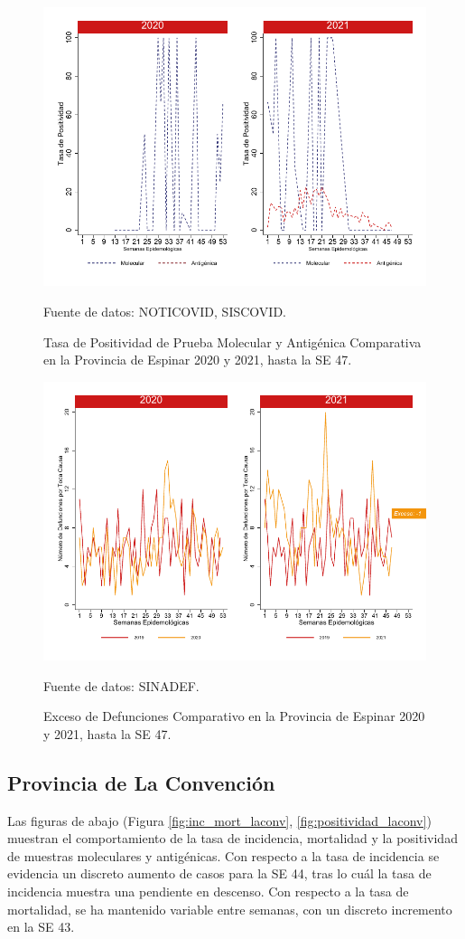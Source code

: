 \documentclass[12pt,a4paper,openany]{book}
\begin{document}
		\begin{figure}[h]
			\caption{Tasa de Positividad de Prueba Molecular y Antigénica Comparativa en la Provincia de Espinar 2020 y 2021, hasta la SE 47.}\label{fig:positividad_espinar}
			\begin{center}
				\includegraphics[width=0.7\linewidth]{../figuras/positividad_20_21_8}
			\end{center}
			{\footnotesize {Fuente de datos: NOTICOVID, SISCOVID.}}
		\end{figure}
		
		\begin{figure}[h]
			\caption{Exceso de Defunciones Comparativo en la Provincia de Espinar 2020 y 2021, hasta la SE 47.}\label{fig:exceso_espinar}
			\begin{center}
				\includegraphics[width=0.7\linewidth]{../figuras/exceso_8}
			\end{center}
			{\footnotesize {Fuente de datos: SINADEF.}}
		\end{figure}
		
		\clearpage
		
		\subsection*{Provincia de La Convención}
		\noindent Las figuras de abajo (Figura \ref{fig:inc_mort_laconv}, \ref{fig:positividad_laconv}) muestran el comportamiento de la tasa de incidencia, mortalidad y la positividad de muestras moleculares y antigénicas. Con respecto a la tasa de incidencia se evidencia un discreto aumento de casos para la SE 44, tras lo cuál la tasa de incidencia muestra una pendiente en descenso.
		Con respecto a la tasa de mortalidad, se ha mantenido variable entre semanas, con un discreto incremento en la SE 43.
		
\end{document}
